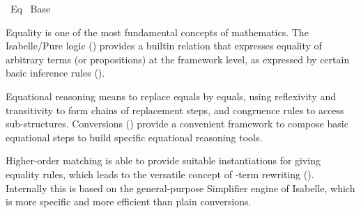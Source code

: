 %
\begin{isabellebody}%
\def\isabellecontext{Eq}%
%
\isadelimtheory
%
\endisadelimtheory
%
\isatagtheory
{}\isamarkupfalse%
\ Eq\isanewline
{}\ Base\isanewline
{}%
\endisatagtheory
{\isafoldtheory}%
%
\isadelimtheory
%
\endisadelimtheory
%
\isamarkuptrue%
%
\begin{isamarkuptext}%
Equality is one of the most fundamental concepts of
  mathematics.  The Isabelle/Pure logic () provides a
  builtin relation  that expresses equality
  of arbitrary terms (or propositions) at the framework level, as
  expressed by certain basic inference rules ().

  Equational reasoning means to replace equals by equals, using
  reflexivity and transitivity to form chains of replacement steps,
  and congruence rules to access sub-structures.  Conversions
  () provide a convenient framework to compose basic
  equational steps to build specific equational reasoning tools.

  Higher-order matching is able to provide suitable instantiations for
  giving equality rules, which leads to the versatile concept of
  -term rewriting ().  Internally
  this is based on the general-purpose Simplifier engine of Isabelle,
  which is more specific and more efficient than plain conversions.


\end{isamarkuptext}
\end{isabellebody}
